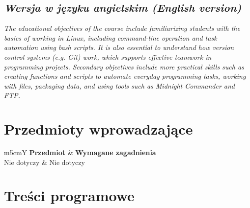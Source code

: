 \documentclass[12pt, a4paper]{article}
\newcommand{\thdrule}{\noalign{\global\setlength{\extrarowheight}{0pt}}}
\newcommand{\thdend}{\noalign{\global\setlength{\extrarowheight}{3pt}}}
\begin{document}
\subsection*{\textit{Wersja w języku angielskim (English version)}}

\textit{The educational objectives of the course include familiarizing students with the basics of working in Linux, including command-line operation and task automation using bash scripts. It is also essential to understand how version control systems (e.g. Git) work, which supports effective teamwork in programming projects. Secondary objectives include more practical skills such as creating functions and scripts to automate everyday programming tasks, working with files, packaging data, and using tools such as Midnight Commander and FTP.}


\section{Przedmioty wprowadzające}

{\scriptsize
\begin{tabularx}{\textwidth}{m{5cm}Y}
\thdrule\toprule
{} {\color{white}\textbf{Przedmiot}} & {\color{white}\textbf{Wymagane zagadnienia}} \\
\midrule\thdend
   Nie dotyczy & Nie dotyczy \\
\bottomrule
\end{tabularx}}

\section{Treści programowe}
\end{document}
